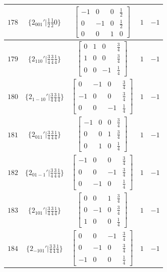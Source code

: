 \documentclass[fleqn,8pt]{jsarticle}
\begin{document}
\begin{longtable}{ccccc}
$ 178 $ & $ \{2{}_{001}{}'|\frac{1}{2} \frac{1}{2} 0\} $ & $ \begin{bmatrix} -1 & 0 & 0 & \frac{1}{2} \\ 0 & -1 & 0 & \frac{1}{2} \\ 0 & 0 & 1 & 0 \end{bmatrix} $ & $ 1 $ & $ -1 $ \\ \hline
$ 179 $ & $ \{2{}_{110}{}'|\frac{3}{4} \frac{3}{4} \frac{1}{4}\} $ & $ \begin{bmatrix} 0 & 1 & 0 & \frac{3}{4} \\ 1 & 0 & 0 & \frac{3}{4} \\ 0 & 0 & -1 & \frac{1}{4} \end{bmatrix} $ & $ 1 $ & $ -1 $ \\ \hline
$ 180 $ & $ \{2{}_{1-10}{}'|\frac{3}{4} \frac{3}{4} \frac{1}{4}\} $ & $ \begin{bmatrix} 0 & -1 & 0 & \frac{3}{4} \\ -1 & 0 & 0 & \frac{3}{4} \\ 0 & 0 & -1 & \frac{1}{4} \end{bmatrix} $ & $ 1 $ & $ -1 $ \\ \hline
$ 181 $ & $ \{2{}_{011}{}'|\frac{3}{4} \frac{3}{4} \frac{1}{4}\} $ & $ \begin{bmatrix} -1 & 0 & 0 & \frac{3}{4} \\ 0 & 0 & 1 & \frac{3}{4} \\ 0 & 1 & 0 & \frac{1}{4} \end{bmatrix} $ & $ 1 $ & $ -1 $ \\ \hline
$ 182 $ & $ \{2{}_{01-1}{}'|\frac{3}{4} \frac{3}{4} \frac{1}{4}\} $ & $ \begin{bmatrix} -1 & 0 & 0 & \frac{3}{4} \\ 0 & 0 & -1 & \frac{3}{4} \\ 0 & -1 & 0 & \frac{1}{4} \end{bmatrix} $ & $ 1 $ & $ -1 $ \\ \hline
$ 183 $ & $ \{2{}_{101}{}'|\frac{3}{4} \frac{3}{4} \frac{1}{4}\} $ & $ \begin{bmatrix} 0 & 0 & 1 & \frac{3}{4} \\ 0 & -1 & 0 & \frac{3}{4} \\ 1 & 0 & 0 & \frac{1}{4} \end{bmatrix} $ & $ 1 $ & $ -1 $ \\ \hline
$ 184 $ & $ \{2{}_{-101}{}'|\frac{3}{4} \frac{3}{4} \frac{1}{4}\} $ & $ \begin{bmatrix} 0 & 0 & -1 & \frac{3}{4} \\ 0 & -1 & 0 & \frac{3}{4} \\ -1 & 0 & 0 & \frac{1}{4} \end{bmatrix} $ & $ 1 $ & $ -1 $ \\ \hline

\end{longtable}
\end{document}
